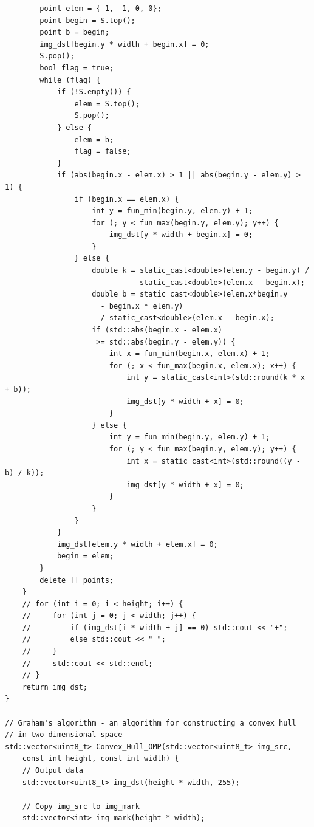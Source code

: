 \documentclass{report}
\begin{document}
\begin{lstlisting}
        point elem = {-1, -1, 0, 0};
        point begin = S.top();
        point b = begin;
        img_dst[begin.y * width + begin.x] = 0;
        S.pop();
        bool flag = true;
        while (flag) {
            if (!S.empty()) {
                elem = S.top();
                S.pop();
            } else {
                elem = b;
                flag = false;
            }
            if (abs(begin.x - elem.x) > 1 || abs(begin.y - elem.y) > 1) {
                if (begin.x == elem.x) {
                    int y = fun_min(begin.y, elem.y) + 1;
                    for (; y < fun_max(begin.y, elem.y); y++) {
                        img_dst[y * width + begin.x] = 0;
                    }
                } else {
                    double k = static_cast<double>(elem.y - begin.y) /
                               static_cast<double>(elem.x - begin.x);
                    double b = static_cast<double>(elem.x*begin.y
                      - begin.x * elem.y)
                      / static_cast<double>(elem.x - begin.x);
                    if (std::abs(begin.x - elem.x)
                     >= std::abs(begin.y - elem.y)) {
                        int x = fun_min(begin.x, elem.x) + 1;
                        for (; x < fun_max(begin.x, elem.x); x++) {
                            int y = static_cast<int>(std::round(k * x + b));
                            img_dst[y * width + x] = 0;
                        }
                    } else {
                        int y = fun_min(begin.y, elem.y) + 1;
                        for (; y < fun_max(begin.y, elem.y); y++) {
                            int x = static_cast<int>(std::round((y - b) / k));
                            img_dst[y * width + x] = 0;
                        }
                    }
                }
            }
            img_dst[elem.y * width + elem.x] = 0;
            begin = elem;
        }
        delete [] points;
    }
    // for (int i = 0; i < height; i++) {
    //     for (int j = 0; j < width; j++) {
    //         if (img_dst[i * width + j] == 0) std::cout << "+";
    //         else std::cout << "_";
    //     }
    //     std::cout << std::endl;
    // }
    return img_dst;
}

// Graham's algorithm - an algorithm for constructing a convex hull
// in two-dimensional space
std::vector<uint8_t> Convex_Hull_OMP(std::vector<uint8_t> img_src,
    const int height, const int width) {
    // Output data
    std::vector<uint8_t> img_dst(height * width, 255);

    // Copy img_src to img_mark
    std::vector<int> img_mark(height * width);


\end{lstlisting}
\end{document}
